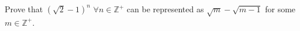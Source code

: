 Prove that $(\sqrt{2}-1)^n$ $\forall n\in \mathbb{Z}^{+}$ can be represented as $\sqrt{m}-\sqrt{m-1}$ for some $m\in \mathbb{Z}^{+}$.